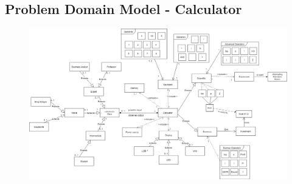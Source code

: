 \documentclass{article}
\begin{document}
\vspace{12pt}
\subsection{Problem Domain Model - Calculator}
\begin{figure}[h!]
    \centering
    \includegraphics[angle=270,scale=0.37]{Problem_4.png}
\end{figure}
\newpage
\end{document}
